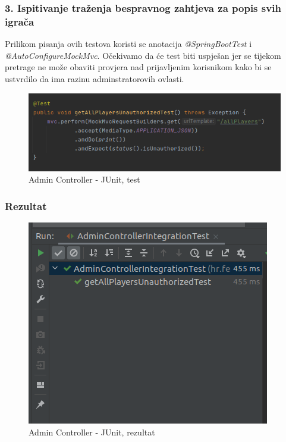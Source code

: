 				\subsubsection {3. Ispitivanje traženja bespravnog zahtjeva za popis svih igrača}
					
					{Prilikom pisanja ovih testova koristi se anotacija \textit{@SpringBootTest} i \textit{@AutoConfigureMockMvc}. Očekivamo da će test biti uspješan jer se tijekom pretrage ne može obaviti provjera nad prijavljenim korisnikom kako bi se ustvrdilo da ima razinu adminstratorovih ovlasti.}
					
						\begin{figure}[H]
							\includegraphics[width=\textwidth]{slike/unauthorizedTest} 
							\centering
							\caption{Admin Controller - JUnit, test}
							\label{}
						\end{figure}
					
				\subsubsection{Rezultat}
				
						\begin{figure}[H]
							\includegraphics[width=\textwidth]{slike/unauthorizedTest_result} 
							\centering
							\caption{Admin Controller - JUnit, rezultat}
							\label{}
						\end{figure}
			
